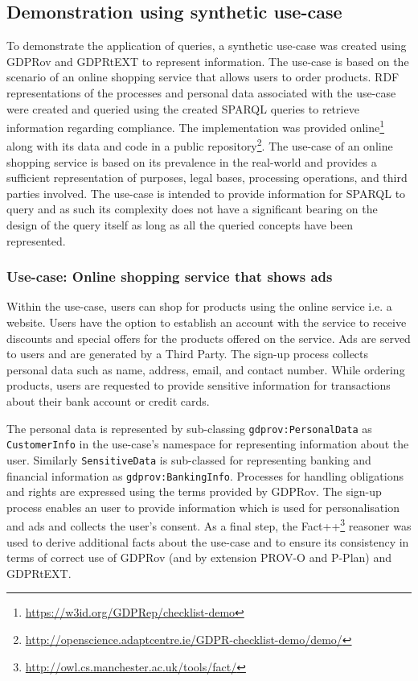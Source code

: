 \subsection{Demonstration using synthetic use-case} \label{sec:testing:sparql:demo}
To demonstrate the application of queries, a synthetic use-case was created using GDPRov and GDPRtEXT to represent information.
The use-case is based on the scenario of an online shopping service that allows users to order products.
RDF representations of the processes and personal data associated with the use-case were created and queried using the created SPARQL queries to retrieve information regarding compliance.
The implementation was provided online\footnote{\url{https://w3id.org/GDPRep/checklist-demo}} along with its data and code in a public repository\footnote{\url{http://openscience.adaptcentre.ie/GDPR-checklist-demo/demo/}}.
The use-case of an online shopping service is based on its prevalence in the real-world and provides a sufficient representation of purposes, legal bases, processing operations, and third parties involved.
The use-case is intended to provide information for SPARQL to query and as such its complexity does not have a significant bearing on the design of the query itself as long as all the queried concepts have been represented.

\subsubsection{Use-case: Online shopping service that shows ads}
Within the use-case, users can shop for products using the online service i.e. a website. Users have the option to establish an account with the service to receive discounts and special offers for the products offered on the service.
Ads are served to users and are generated by a Third Party.
The sign-up process collects personal data such as name, address, email, and contact number.
While ordering products, users are requested to provide sensitive information for transactions about their bank account or credit cards.

The personal data is represented by sub-classing \texttt{gdprov:PersonalData} as \texttt{CustomerInfo} in the use-case's namespace for representing information about the user.
Similarly \texttt{SensitiveData} is sub-classed for representing banking and financial information as \texttt{gdprov:BankingInfo}.
Processes for handling obligations and rights are expressed using the terms provided by GDPRov.
The sign-up process enables an user to provide information which is used for personalisation and ads and collects the user's consent.
As a final step, the Fact++\footnote{\url{http://owl.cs.manchester.ac.uk/tools/fact/}}
reasoner was used to derive additional facts about the use-case and to ensure its consistency in terms of correct use of GDPRov (and by extension PROV-O and P-Plan) and GDPRtEXT.

